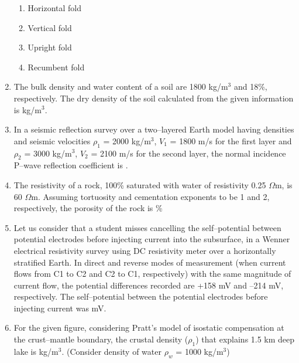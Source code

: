 \documentclass[journal,12pt,onecolumn]{IEEEtran}
\theoremstyle{remark}
\begin{document}
\begin{enumerate}
\begin{enumerate}
\item Horizontal fold
\item Vertical fold
\item Upright fold
\item Recumbent fold
\end{enumerate}
\vspace{0.5cm}




\item The bulk density and water content of a soil are 1800 kg/m$^3$ and 18\%, respectively. The dry density of the soil calculated from the given information is \underline{\hspace{10mm}} kg/m$^3$.
\vspace{0.5cm}

\item In a seismic reflection survey over a two--layered Earth model having densities and seismic velocities $\rho_1$ = 2000 kg/m$^3$, $V_1$ = 1800 m/s for the first layer and $\rho_2$ = 3000 kg/m$^3$, $V_2$ = 2100 m/s for the second layer, the normal incidence P--wave reflection coefficient is \underline{\hspace{10mm}}.
\vspace{0.5cm}

\item The resistivity of a rock, 100\% saturated with water of resistivity 0.25 $\Omega$m, is 60 $\Omega$m. Assuming tortuosity and cementation exponents to be 1 and 2, respectively, the porosity of the rock is \underline{\hspace{10mm}}\%
\vspace{0.5cm}

\item Let us consider that a student misses cancelling the self--potential between potential electrodes before injecting current into the subsurface, in a Wenner electrical resistivity survey using DC resistivity meter over a horizontally stratified Earth. In direct and reverse modes of measurement (when current flows from C1 to C2 and C2 to C1, respectively) with the same magnitude of current flow, the potential differences recorded are +158 mV and --214 mV, respectively. The self--potential between the potential electrodes before injecting current was \underline{\hspace{10mm}} mV.
\vspace{0.5cm}


\item For the given figure, considering Pratt's model of isostatic compensation at the crust--mantle boundary, the crustal density ($\rho_1$) that explains 1.5 km deep lake is \underline{\hspace{10mm}} kg/m$^3$. (Consider density of water $\rho_w$ = 1000 kg/m$^3$)


\end{enumerate}
\end{document}
